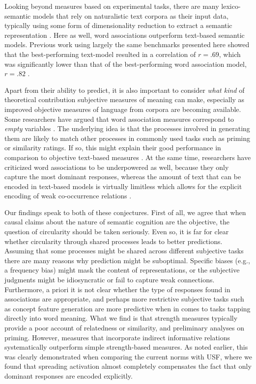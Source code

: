 \documentclass[a4paper,doc,natbib,floatsintext]{apa6}
\begin{document}
Looking beyond measures based on experimental tasks, there are many lexico-semantic models that rely on naturalistic text corpora as their input data, typically using some form of dimensionality reduction to extract a semantic representation \citep[see][for an overview]{Jones2015}. Here as well, word associations outperform text-based semantic models. Previous work using largely the same benchmarks presented here showed that the best-performing text-model resulted in a correlation of $r = .69$, which was significantly lower than that of the best-performing word association model, $r = .82$ \citep{DeDeyne2016ACL}.

Apart from their ability to predict, it is also important to consider \textit{what kind} of theoretical contribution subjective measures of meaning can make, especially as improved objective measures of language from corpora are becoming available.
Some researchers have argued that word association measures correspond to \textit{empty} variables \citep[as discussed in ][]{Hutchison2008}. The underlying idea is that the processes involved in generating them are likely to match other processes in commonly used tasks such as priming or similarity ratings. If so, this might explain their good performance in comparison to objective text-based measures \citep[e.g.,][]{JonesHills2015}. At the same time, researchers have criticized word associations to be underpowered as well, because they only capture the most dominant responses, whereas the amount of text that can be encoded in text-based models is virtually limitless which allows for the explicit encoding of weak co-occurrence relations \citep{Roelke2018}.

Our findings speak to both of these conjectures. First of all, we agree that when causal claims about the nature of semantic cognition are the objective, the  question of circularity should be taken seriously. Even so, it is far for clear whether circularity through shared processes leads to better predictions. Assuming that some processes might be shared across different subjective tasks there are many reasons why prediction might be suboptimal. Specific biases (e.g., a frequency bias) might mask the content of representations, or the subjective judgments might be idiosyncratic  or fail to capture weak connections. Furthermore, a priori it is not clear whether the type of responses found in associations are appropriate, and perhaps more restrictive subjective tasks such as concept feature generation are more predictive when in comes to tasks tapping directly into word meaning.
What we find is that strength measures typically provide a poor account of relatedness or similarity,  and preliminary analyses on priming. However, measures that incorporate indirect informative relations systematically outperform simple strength-based measures. As noted earlier, this was clearly demonstrated when comparing the current norms with USF, where we found that spreading activation almost completely compensates the fact that only dominant responses are encoded explicitly.
\end{document}
